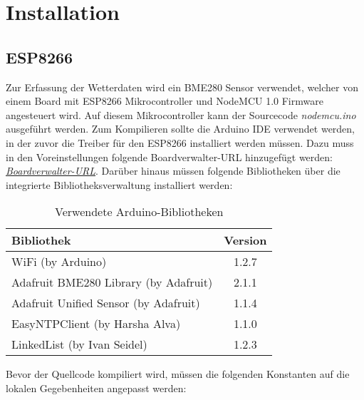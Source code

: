 

\section{Installation}\label{Installation}

\subsection{ESP8266}\label{ESP}
Zur Erfassung der Wetterdaten wird ein BME280 Sensor verwendet, welcher von einem Board mit ESP8266 Mikrocontroller und NodeMCU 1.0 Firmware angesteuert wird.
Auf diesem Mikrocontroller kann der Sourcecode \textit{nodemcu.ino} ausgeführt werden.
Zum Kompilieren sollte die Arduino IDE verwendet werden, in der zuvor die Treiber für den ESP8266 installiert werden müssen.
Dazu muss in den Voreinstellungen folgende Boardverwalter-URL hinzugefügt werden: \textit{\href{http://arduino.esp8266.com/stable/package\_esp8266com\_index.json}{Boardverwalter-URL}}.
Darüber hinaus müssen folgende Bibliotheken über die integrierte Bibliotheksverwaltung installiert werden:

\begin{table}[hbt]
    \centering
    \begin{minipage}[t]{.5\textwidth}
        \caption{Verwendete Arduino-Bibliotheken}
        \begin{tabular}{|l|c|}
            \hline
            \textbf{Bibliothek}                   & \textbf{Version} \\
            \hline
            WiFi (by Arduino)                     & 1.2.7            \\
            \hline
            Adafruit BME280 Library (by Adafruit) & 2.1.1            \\
            \hline
            Adafruit Unified Sensor (by Adafruit) & 1.1.4            \\
            \hline
            EasyNTPClient (by Harsha Alva)        & 1.1.0            \\
            \hline
            LinkedList (by Ivan Seidel)           & 1.2.3            \\
			\hline
		\end{tabular}
\label{tab:usedArduinoLibs}
\end{minipage}
\end{table}

Bevor der Quellcode kompiliert wird, müssen die folgenden Konstanten auf die lokalen Gegebenheiten angepasst werden:


